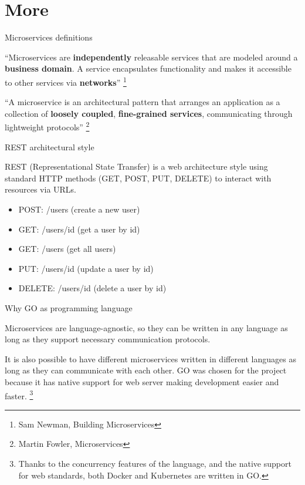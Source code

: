 \documentclass{beamer}
\begin{document}
\section{More}
\begin{frame}{Microservices definitions}
	\label{microservices_definitions}
	\begin{block}{}
		“Microservices are \textbf{independently} releasable services that are modeled around a \textbf{business domain}. A service encapsulates functionality and makes it accessible to other services via \textbf{networks}” \footnote{Sam Newman, Building Microservices}
	\end{block}
	\begin{block}{}
		“A microservice is an architectural pattern that arranges an application as a collection of \textbf{loosely coupled}, \textbf{fine-grained services}, communicating through lightweight protocols” \footnote{Martin Fowler, Microservices}
	\end{block}

\hyperlink{index_1}{}
\end{frame}

\begin{frame}{REST architectural style}
	\begin{block}{}
		REST (Representational State Transfer) is a web architecture style using standard HTTP methods (GET, POST, PUT, DELETE) to interact with resources via URLs.
	\end{block}
	\begin{itemize}
		\item POST: /users (create a new user)
		\item GET: /users/{id} (get a user by id)
		\item GET: /users (get all users)
		\item PUT: /users/{id} (update a user by id)
		\item DELETE: /users/{id} (delete a user by id)
	\end{itemize}
	
	\label{rest}
\hyperlink{index_1}{}
\end{frame}

\begin{frame}{Why GO as programming language}
	\label{golang}
	\begin{block}{}
		Microservices are language-agnostic, so they can be written in any language as long as they support necessary communication protocols.
		\end{block}
		It is also possible to have different microservices written in different languages as long as they can communicate with each other.
		\newline \newline \newline
		GO was chosen for the project because it has native support for web server making development easier and faster.  \footnote{Thanks to the concurrency features of the language, and the native support for web standards, both Docker and Kubernetes are written in GO.}
\newline
\hyperlink{index_1}{}
\end{frame}
\end{document}
